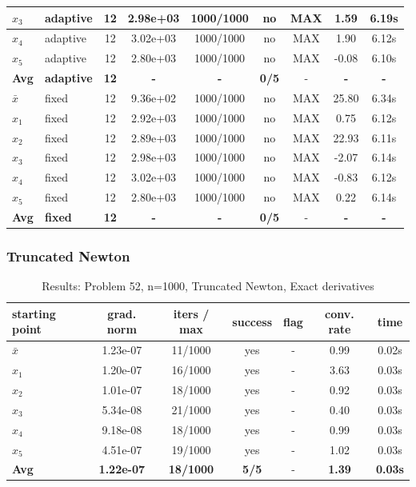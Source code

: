 \begin{longtable}{|l|l|c|c|c|c|c|c|c|}
\hline
$x_3$ & adaptive & 12 & 2.98e+03 & 1000/1000 & no & MAX & 1.59 & 6.19s \\
\hline
$x_4$ & adaptive & 12 & 3.02e+03 & 1000/1000 & no & MAX & 1.90 & 6.12s \\
\hline
$x_5$ & adaptive & 12 & 2.80e+03 & 1000/1000 & no & MAX & -0.08 & 6.10s \\
\hline
\hline\hline
\textbf{Avg} & \textbf{adaptive} & \textbf{12} & \textbf{-} & \textbf{-} & \textbf{0/5} & - & \textbf{-} & \textbf{-} \\
\hline\hline
\hline
$\bar{x}$ & fixed & 12 & 9.36e+02 & 1000/1000 & no & MAX & 25.80 & 6.34s \\
\hline
$x_1$ & fixed & 12 & 2.92e+03 & 1000/1000 & no & MAX & 0.75 & 6.12s \\
\hline
$x_2$ & fixed & 12 & 2.89e+03 & 1000/1000 & no & MAX & 22.93 & 6.11s \\
\hline
$x_3$ & fixed & 12 & 2.98e+03 & 1000/1000 & no & MAX & -2.07 & 6.14s \\
\hline
$x_4$ & fixed & 12 & 3.02e+03 & 1000/1000 & no & MAX & -0.83 & 6.12s \\
\hline
$x_5$ & fixed & 12 & 2.80e+03 & 1000/1000 & no & MAX & 0.22 & 6.14s \\
\hline
\hline\hline
\textbf{Avg} & \textbf{fixed} & \textbf{12} & \textbf{-} & \textbf{-} & \textbf{0/5} & - & \textbf{-} & \textbf{-} \\
\hline\hline
\end{longtable}


\subsubsection{Truncated Newton}

\begin{longtable}{|l|c|c|c|c|c|c|}
\caption{Results: Problem 52, n=1000, Truncated Newton, Exact derivatives} \\
\hline
\textbf{starting point} & \textbf{grad. norm} & \textbf{iters / max} & \textbf{success} & \textbf{flag} & \textbf{conv. rate} & \textbf{time} \\
\hline
\endfirsthead
\endhead
\endfoot
\hline
\endlastfoot
$\bar{x}$ & 1.23e-07 & 11/1000 & yes & - & 0.99 & 0.02s \\
\hline
$x_1$ & 1.20e-07 & 16/1000 & yes & - & 3.63 & 0.03s \\
\hline
$x_2$ & 1.01e-07 & 18/1000 & yes & - & 0.92 & 0.03s \\
\hline
$x_3$ & 5.34e-08 & 21/1000 & yes & - & 0.40 & 0.03s \\
\hline
$x_4$ & 9.18e-08 & 18/1000 & yes & - & 0.99 & 0.03s \\
\hline
$x_5$ & 4.51e-07 & 19/1000 & yes & - & 1.02 & 0.03s \\
\hline
\hline\hline
\textbf{Avg} & \textbf{1.22e-07} & \textbf{18/1000} & \textbf{5/5} & - & \textbf{1.39} & \textbf{0.03s} \\
\hline\hline
\end{longtable}


